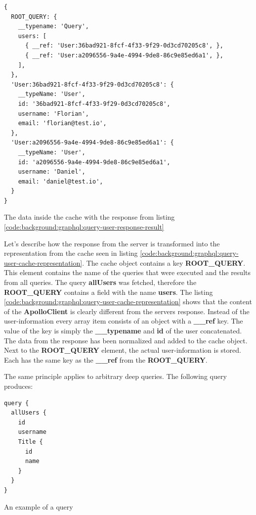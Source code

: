 \ifshowListings
\begin{listing}[H]
\begin{verbatim}
{
  ROOT_QUERY: {
    __typename: 'Query',
    users: [
      { __ref: 'User:36bad921-8fcf-4f33-9f29-0d3cd70205c8', },
      { __ref: 'User:a2096556-9a4e-4994-9de8-86c9e85ed6a1', },
    ],
  },
  'User:36bad921-8fcf-4f33-9f29-0d3cd70205c8': {
    __typeName: 'User',
    id: '36bad921-8fcf-4f33-9f29-0d3cd70205c8',
    username: 'Florian',
    email: 'florian@test.io',
  },
  'User:a2096556-9a4e-4994-9de8-86c9e85ed6a1': {
    __typeName: 'User',
    id: 'a2096556-9a4e-4994-9de8-86c9e85ed6a1',
    username: 'Daniel',
    email: 'daniel@test.io',
  }
}
\end{verbatim}
\caption{The data inside the cache with the response from listing \ref{code:background:graphql:query-user-response-result}}\label{code:background:graphql:query-user-cache-representation}
\end{listing}
\fi

Let's describe how the response from the server is transformed into the representation from the cache seen in listing \ref{code:background:graphql:query-user-cache-representation}. The cache object contains a key \textbf{ROOT\_QUERY}. This element contains the name of the queries that were executed and the results from all queries. The query \textbf{allUsers} was fetched, therefore the \textbf{ROOT\_QUERY} contains a field with the name \textbf{users}. The listing \ref{code:background:graphql:query-user-cache-representation} shows that the content of the \textbf{ApolloClient} is clearly different from the servers response. Instead of the user-information every array item consists of an object with a \textbf{\_\_ref} key. The value of the key is simply the \textbf{\_\_typename} and \textbf{id} of the user concatenated. The data from the response has been normalized and added to the cache object. Next to the \textbf{ROOT\_QUERY} element, the actual user-information is stored. Each has the same key as the \textbf{\_\_ref} from the \textbf{ROOT\_QUERY}. 

The same principle applies to arbitrary deep queries. The following query produces:

\ifshowListings
\begin{listing}[H]
\begin{verbatim}
query {
  allUsers {
    id
    username
    Title {
      id
      name
    }
  }
}
\end{verbatim}
\caption{An example of a query}\label{code:background:graphql:nested-query-user-cache}
\end{listing}
\fi

